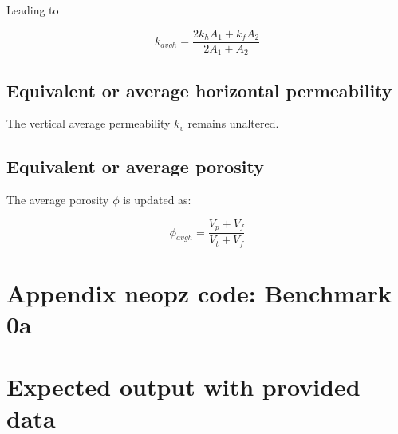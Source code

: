 \documentclass{article}
\begin{document}
Leading to 

\begin{equation}
k_{avgh}=\frac{2 k_{h}A_{1}+k_{f}A_{2}}{2 A_{1}+A_{2}}
\end{equation}

\subsection*{Equivalent or average horizontal permeability}

The vertical average permeability $k_v$ remains unaltered.

\subsection*{Equivalent or average porosity}

The average porosity $\phi$ is updated as:

\begin{equation}
\phi_{avgh}=\frac{V_{p}+V_{f}}{V_{t}+V_{f}}
\end{equation}

\section*{Appendix neopz code:  Benchmark 0a}

\section{Expected output with provided data}
\end{document}
